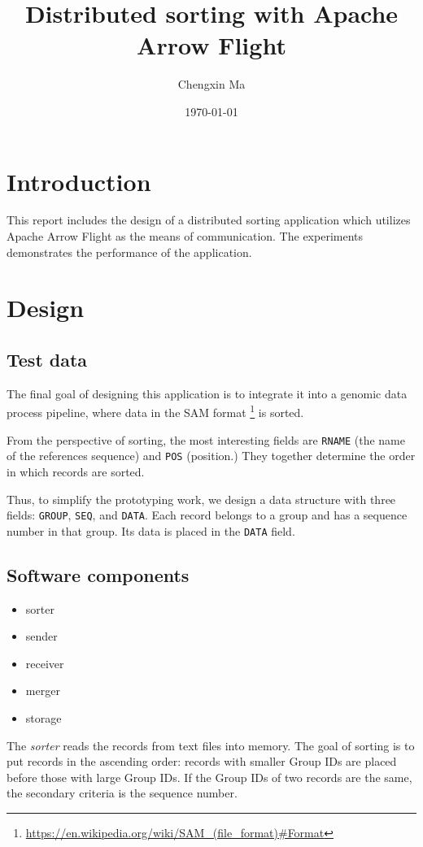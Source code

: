 \documentclass{article}
\title{Distributed sorting with Apache Arrow Flight}
\author{Chengxin Ma}
\date{\today}
\begin{document}
\maketitle

\section{Introduction}
This report includes the design of a distributed sorting application which utilizes Apache Arrow Flight as the means of communication.
The experiments demonstrates the performance of the application.

\section{Design}
\subsection{Test data}
The final goal of designing this application is to integrate it into a genomic data process pipeline, where data in the SAM format
\footnote{\url{https://en.wikipedia.org/wiki/SAM_(file_format)\#Format}} is sorted.

From the perspective of sorting, the most interesting fields are \texttt{RNAME} (the name of the references sequence) and \texttt{POS} (position.)
They together determine the order in which records are sorted.

Thus, to simplify the prototyping work, we design a data structure with three fields: \texttt{GROUP}, \texttt{SEQ}, and \texttt{DATA}.
Each record belongs to a group and has a sequence number in that group.
Its data is placed in the \texttt{DATA} field.

\subsection{Software components}

\begin{itemize}
    \item sorter
    \item sender
    \item receiver
    \item merger
    \item storage
\end{itemize}

The \textit{sorter} reads the records from text files into memory.
The goal of sorting is to put records in the ascending order: records with smaller Group IDs are placed before those with large Group IDs.
If the Group IDs of two records are the same, the secondary criteria is the sequence number.
\end{document}
